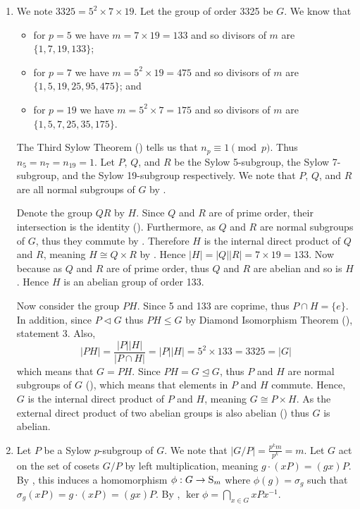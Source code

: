 \begin{enumerate}
    \item We note $3325 = 5^2 \times 7 \times 19$. Let the group of order 3325 be $G$. We know that
    \begin{itemize}
        \item for $p = 5$ we have $m = 7 \times 19 = 133$ and so divisors of $m$ are $\{1, 7, 19, 133\}$;
        \item for $p = 7$ we have $m = 5^2 \times 19 = 475$ and so divisors of $m$ are $\{1, 5, 19, 25, 95, 475\}$; and
        \item for $p = 19$ we have $m = 5^2 \times 7 = 175$ and so divisors of $m$ are $\{1, 5, 7, 25, 35, 175\}$.
    \end{itemize}
    The Third Sylow Theorem () tells us that $n_p \equiv 1 \pmod p$. Thus $n_5 = n_7 = n_{19} = 1$. Let $P$, $Q$, and $R$ be the Sylow 5-subgroup, the Sylow 7-subgroup, and the Sylow 19-subgroup respectively. We note that $P$, $Q$, and $R$ are all normal subgroups of $G$ by .

    Denote the group $QR$ by $H$. Since $Q$ and $R$ are of prime order, their intersection is the identity (). Furthermore, as $Q$ and $R$ are normal subgroups of $G$, thus they commute by . Therefore $H$ is the internal direct product of $Q$ and $R$, meaning $H \cong Q \times R$ by . Hence $|H| = |Q||R| = 7 \times 19 = 133$. Now because as $Q$ and $R$ are of prime order, thus $Q$ and $R$ are abelian and so is $H$. Hence $H$ is an abelian group of order 133.

    Now consider the group $PH$. Since 5 and 133 are coprime, thus $P \cap H = \{e\}$. In addition, since $P \lhd G$ thus $PH \leq G$ by Diamond Isomorphism Theorem (), statement 3. Also,
    \[
        |PH| = \frac{|P||H|}{|P \cap H|} = |P||H| = 5^2 \times 133 = 3325 = |G|
    \]
    which means that $G = PH$. Since $PH = G \unlhd G$, thus $P$ and $H$ are normal subgroups of $G$ (), which means that elements in $P$ and $H$ commute. Hence, $G$ is the internal direct product of $P$ and $H$, meaning $G \cong P \times H$. As the external direct product of two abelian groups is also abelian () thus $G$ is abelian.

    \item Let $P$ be a Sylow $p$-subgroup of $G$. We note that $|G/P| = \frac{p^km}{p^k} = m$. Let $G$ act on the set of cosets $G/P$ by left multiplication, meaning $g\cdot (xP) = (gx)P$. By , this induces a homomorphism $\phi: G \to \mathrm{S}_{m}$ where $\phi(g) = \sigma_g$ such that $\sigma_g(xP) = g\cdot (xP) = (gx)P$. By , $\ker\phi = \bigcap_{x \in G}xPx^{-1}$.
    

\end{enumerate}
